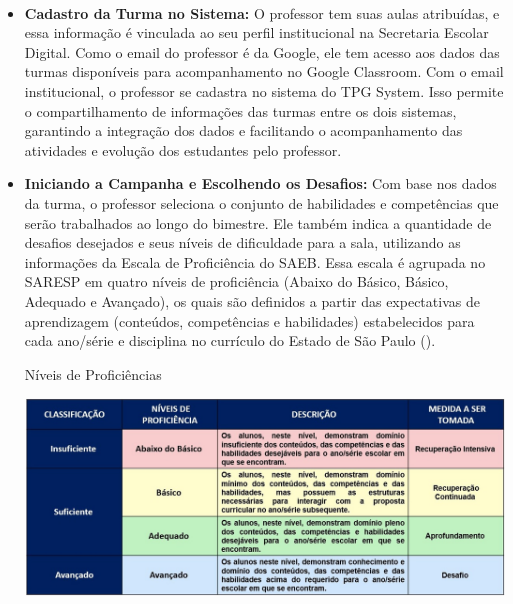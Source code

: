 \\
\begin{itemize}
\\
\item \textbf{Cadastro da Turma no Sistema:} O professor tem suas aulas atribuídas, e essa informação é vinculada ao seu perfil institucional na Secretaria Escolar Digital. Como o email do professor é da Google, ele tem acesso aos dados das turmas disponíveis para acompanhamento no Google Classroom. Com o email institucional, o professor se cadastra no sistema do TPG System. Isso permite o compartilhamento de informações das turmas entre os dois sistemas, garantindo a integração dos dados e facilitando o acompanhamento das atividades e evolução dos estudantes pelo professor.
\\

\item \textbf{Iniciando a Campanha e Escolhendo os Desafios:} Com base nos dados da turma, o professor seleciona o conjunto de habilidades e competências que serão trabalhados ao longo do bimestre. Ele também indica a quantidade de desafios desejados e seus níveis de dificuldade para a sala, utilizando as informações da Escala de Proficiência do SAEB. Essa escala é agrupada no SARESP em quatro níveis de proficiência (Abaixo do Básico, Básico, Adequado e Avançado), os quais são definidos a partir das expectativas de aprendizagem (conteúdos, competências e habilidades) estabelecidos para cada ano/série e disciplina no currículo do Estado de São Paulo ().
\\

\begin{table}[!h]
\centering
{}
\caption{Níveis de Proficiências}%
\label{grph:tabNivelProf}
\includegraphics[width = 1.3 \CaptionWidth]{Illustrations/tbNivelProficencia.jpg}
\\
\end{table}
\\


\end{itemize}
